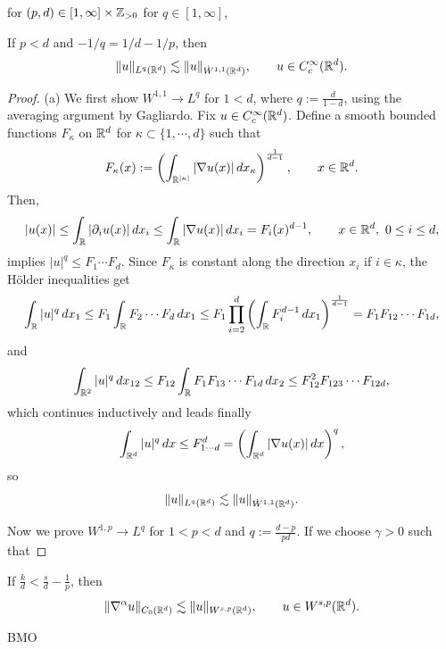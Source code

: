 \documentclass{../../large}
\begin{document}
\begin{prb}
for $(p,d)\in[1,\infty]\times\mathbb{Z}_{>0}$
for $q\in[1,\infty]$,
\begin{parts}
\item If $p<d$ and $-1/q=1/d-1/p$, then
\[\|u\|_{L^q(\mathbb{R}^d)}\lesssim\|u\|_{\dot W^{1,1}(\mathbb{R}^d)},\qquad u\in C_c^\infty(\mathbb{R}^d).\]
\end{parts}
\end{prb}
\begin{proof}
(a)
We first show $W^{1,1}\to L^q$ for $1<d$, where $q:=\frac d{1-d}$, using the averaging argument by Gagliardo.
Fix $u\in C_c^\infty(\mathbb{R}^d)$.
Define a smooth bounded functions $F_\kappa$ on $\mathbb{R}^d$ for $\kappa\subset\{1,\cdots,d\}$ such that
\[F_\kappa(x):=\left(\int_{\mathbb{R}^{|\kappa|}}|\nabla u(x)|\,dx_\kappa\right)^{\frac1{d-1}},\qquad x\in\mathbb{R}^d.\]
Then,
\[|u(x)|\le\int_{\mathbb{R}}|\partial_iu(x)|\,dx_i\le\int_{\mathbb{R}}|\nabla u(x)|\,dx_i=F_i(x)^{d-1},\qquad x\in\mathbb{R}^d,\ 0\le i\le d,\]
implies $|u|^q\le F_1\cdots F_d$.
Since $F_\kappa$ is constant along the direction $x_i$ if $i\in\kappa$, the H\"older inequalities get
\[\int_{\mathbb{R}}|u|^q\,dx_1\le F_1\int_{\mathbb{R}} F_2\cdots F_d\,dx_1\le F_1\prod_{i=2}^d\left(\int_{\mathbb{R}} F_i^{d-1}\,dx_1\right)^{\frac1{d-1}}=F_1F_{12}\cdots F_{1d},\]
and
\[\int_{\mathbb{R}^2}|u|^q\,dx_{12}\le F_{12}\int_{\mathbb{R}} F_1F_{13}\cdots F_{1d}\,dx_2\le F_{12}^2F_{123}\cdots F_{12d},\]
which continues inductively and leads finally
\[\int_{\mathbb{R}^d}|u|^q\,dx\le F_{1\cdots d}^d=\left(\int_{\mathbb{R}^d}|\nabla u(x)|\,dx\right)^q,\]
so
\[\|u\|_{L^q(\mathbb{R}^d)}\lesssim\|u\|_{\dot W^{1,1}(\mathbb{R}^d)}.\]

Now we prove $W^{1,p}\to L^q$ for $1<p<d$ and $q:=\frac{d-p}{pd}$.
If we choose $\gamma>0$ such that


\end{proof}



\begin{prb}
\end{prb}
\begin{prb}
\begin{parts}
\item If $\frac kd<\frac sd-\frac1p$, then
\[\|\nabla^\alpha u\|_{C_0(\mathbb{R}^d)}\lesssim\|u\|_{W^{s,p}(\mathbb{R}^d)},\qquad u\in W^{s,p}(\mathbb{R}^d).\]
\end{parts}
\end{prb}
\begin{prb} BMO
\end{prb}
\end{document}
